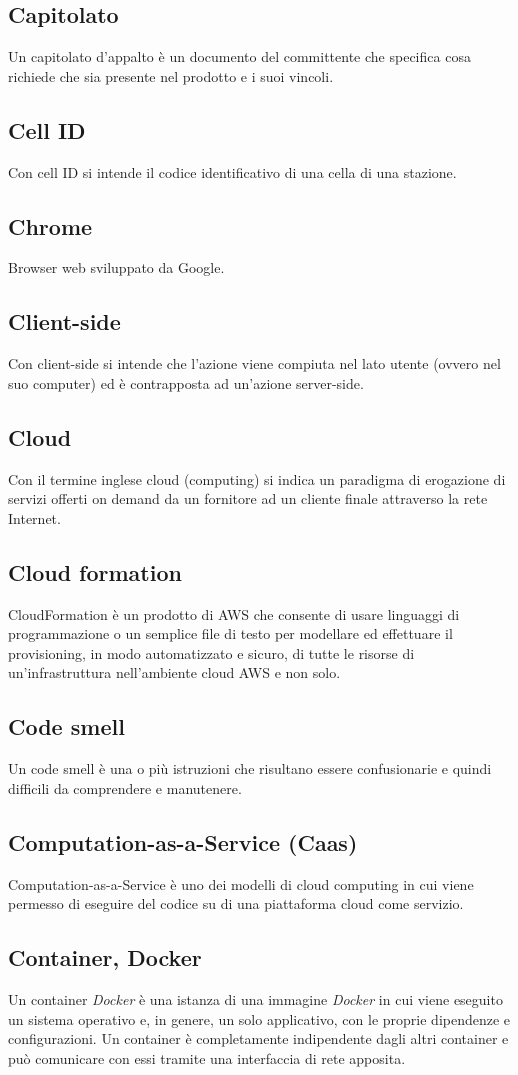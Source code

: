 \subsection{Capitolato}  Un capitolato d'appalto è un documento del committente che specifica cosa richiede che sia presente nel prodotto e i suoi vincoli.
\subsection{Cell ID}  Con cell ID si intende il codice identificativo di una cella di una stazione.
\subsection{Chrome}  Browser web sviluppato da Google.
\subsection{Client-side}  Con client-side si intende che l'azione viene compiuta nel lato utente (ovvero nel suo computer) ed è contrapposta ad un'azione server-side.
\subsection{Cloud}  Con il termine inglese cloud (computing) si indica un paradigma di erogazione di servizi offerti on demand da un fornitore ad un cliente finale attraverso la rete Internet. 
\subsection{Cloud formation}  CloudFormation è un prodotto di AWS che consente di usare linguaggi di programmazione o un semplice file di testo per modellare ed effettuare il provisioning, in modo automatizzato e sicuro, di tutte le risorse di un'infrastruttura nell'ambiente cloud AWS e non solo.
\subsection{Code smell} Un code smell è una o più istruzioni che risultano essere confusionarie e quindi difficili da comprendere e manutenere.
\subsection{Computation-as-a-Service (Caas)}  Computation-as-a-Service è uno dei modelli di cloud computing in cui viene permesso di eseguire del codice su di una piattaforma cloud come servizio.
\subsection{Container, Docker}  Un container \textit{Docker} è una istanza di una immagine \textit{Docker} in cui viene eseguito un sistema operativo e, in genere, un solo applicativo, con le proprie dipendenze e configurazioni. Un container è completamente indipendente dagli altri container e può comunicare con essi tramite una interfaccia di rete apposita.
